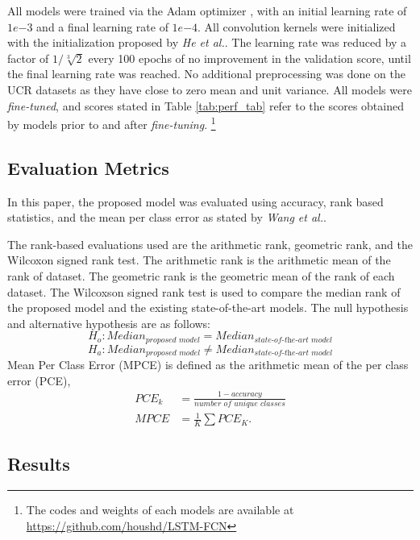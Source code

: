 \documentclass[article]{IEEEtran}
\begin{document}
All models were trained via the Adam optimizer \cite{kingma2014adam}, with an initial learning rate of $1e{-3}$ and a final learning rate of $1e{-4}$. All convolution kernels were initialized with the initialization proposed by \textit{He et al.}\cite{he2015delving}. The learning rate was reduced by a factor of $1/{\sqrt[3]{2}}$ every 100 epochs of no improvement in the validation score, until the final learning rate was reached. No additional preprocessing was done on the UCR datasets as they have close to zero mean and unit variance. All models were \textit{fine-tuned}, and scores stated in Table \ref{tab:perf_tab} refer to the scores obtained by models prior to and after \textit{fine-tuning}. \footnote{The codes and weights of each models are available at \href{https://github.com/houshd/LSTM-FCN}{https://github.com/houshd/LSTM-FCN}}
 
\subsection{Evaluation Metrics}
In this paper, the proposed model was evaluated using accuracy, rank based statistics, and the mean per class error as stated by \textit{Wang et al.}\cite{wang2017time}.

The rank-based evaluations used are the arithmetic rank, geometric rank, and the Wilcoxon signed rank test. The arithmetic rank is the arithmetic mean of the rank of dataset. The geometric rank is the geometric mean of the rank of each dataset. The Wilcoxson signed rank test is used to compare the median rank of the proposed model and the existing state-of-the-art models. The null hypothesis and alternative hypothesis are as follows:
\begin{equation*}
H_o:Median_{\textit{proposed model}} = Median_{\textit{state-of-the-art model}}
\end{equation*}
\begin{equation*}
H_a:Median_{\textit{proposed model}} \neq Median_{\textit{state-of-the-art model}}
\end{equation*}
Mean Per Class Error (MPCE) is defined as the arithmetic mean of the per class error (PCE),
\begin{align*}
PCE_k &=\frac{1-accuracy}{\textit{number of unique classes}} \\
MPCE &=\frac{1}{\textit{K}} \sum{PCE_K}.
\end{align*}
 


\subsection{Results}
\end{document}
